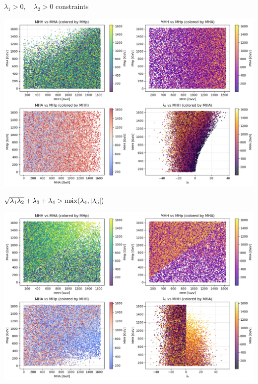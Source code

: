 \documentclass{../bredelebeamer}
\begin{document}
\begin{frame}{$\lambda_1 > 0, \quad \lambda_2 > 0$ constraints}
  \begin{center}
    \includegraphics[width=\textwidth]{stability_lam1_2_condition_THDM_param_scan_analysis}
  \end{center}
\end{frame}


\begin{frame}{$\sqrt{\lambda_1\lambda_2} + \lambda_3 + \lambda_4 > \text{máx}(\lambda_4, \abs{\lambda_5})$}
  \begin{center}
    \includegraphics[width=\textwidth]{stability_lam3_4_condition_THDM_param_scan_analysis}
  \end{center}
\end{frame}
\end{document}

